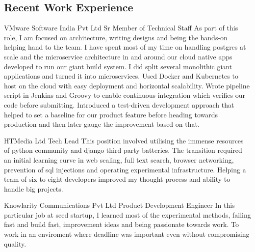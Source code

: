 \documentclass[10pt]{article} %
\begin{document}
\begin{paracol}{2}
\section{Recent Work Experience}





{} %
{VMware Software India Pvt Ltd} %
{Sr Member of Technical Staff} %
    {As part of this role, I am focused on architecture, writing designs and being the hands-on helping hand to the team.}
    {I have spent most of my time on handling postgres at scale and the microservice architecture in and around our cloud native apps developed to run our giant build system.}
    {I did split several monolithic giant applications and turned it into microservices. Used Docker and Kubernetes to host on the cloud with easy deployment and horizontal scalability.}
    {Wrote pipeline script in Jenkins and Groovy to enable continuous integration which verifies our code before submitting.}
    {Introduced a test-driven development approach that helped to set a baseline for our product feature before heading towards production and then later gauge the improvement based on that.} %


{} %
{HTMedia Ltd} %
{Tech Lead} %
{This position involved utilising the immense resources of python community and django third party batteries. The transition required an initial learning curve in web scaling, full text search, browser networking, prevention of sql injections and operating experimental infrastructure. Helping a team of six to eight developers improved my thought process and ability to handle big projects.}  %


{} %
{Knowlarity Communications Pvt Ltd} %
{Product Development Engineer} %
{In this particular job at seed startup, I learned most of the experimental methods, failing fast and build fast, improvement ideas and being passionate towards work.}
{To work in an enviroment where deadline was important even without compromising quality.} %


\end{paracol}
\end{document}
